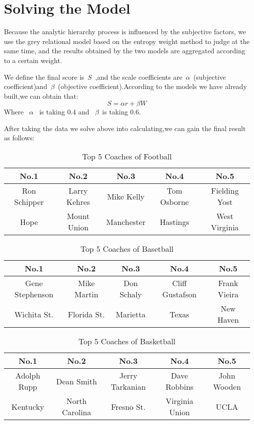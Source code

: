 \documentclass{mcmthesis}
\begin{document}
\section{Solving the Model} 
\par Because the analytic hierarchy process is influenced by the subjective factors, we use the grey relational model based on the entropy weight method to judge at the same time, and the results obtained by the two models are aggregated according to a certain weight.
\par We define the final score is~$S$~,and the scale coefficients are~$\alpha $~(subjective coefficient)and~$\beta $~(objective coefficient).According to the models we have already built,we can obtain that:
\begin{equation}
S=\alpha r+\beta W
\end{equation}
Where ~$\alpha $~ is taking 0.4 and ~$\beta $~is taking 0.6.
\par After taking the data we solve above into calculating,we can gain the final result as follows:

\begin{table}[h]
\centering
 \caption{\label{tab:test}Top 5 Coaches of Football}
 \begin{tabular}{ccccc}
  \toprule
 No.1 & No.2 & No.3 & No.4 & No.5 \\
  \midrule
Ron Schipper  & Larry Kehres & Mike Kelly &Tom Osborne&Fielding Yost \\
Hope &Mount Union &Manchester&Hastings&West Virginia\\
  \bottomrule
 \end{tabular}
\end{table}


\begin{table}[h]
\centering
 \caption{\label{tab:test}Top 5 Coaches of Basetball}
 \begin{tabular}{ccccc}
  \toprule
 No.1 & No.2 & No.3 & No.4 & No.5 \\
  \midrule
Gene Stephenson  & Mike Martin & Don Schaly &Cliff Gustafson&Frank Vieira \\
Wichita St. &Florida St.  &Marietta &Texas&New Haven \\
  \bottomrule
 \end{tabular}
\end{table}

\begin{table}[!ht]
\centering
 \caption{\label{tab:test}Top 5 Coaches of Basketball}
 \begin{tabular}{ccccc}
  \toprule
 No.1 & No.2 & No.3 & No.4 & No.5 \\
  \midrule
Adolph Rupp  & Dean Smith & Jerry Tarkanian &Dave Robbins&John Wooden \\
Kentucky &North Carolina &Fresno St. &Virginia Union&UCLA\\
  \bottomrule
 \end{tabular}
\end{table}
\end{document}
